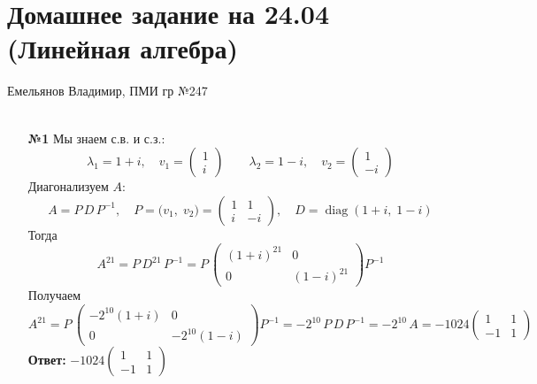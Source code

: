\documentclass[a4paper]{article}
\begin{document}
\section*{Домашнее задание на 24.04 (Линейная алгебра)}
{\large Емельянов Владимир, ПМИ гр №247}\\\\
\begin{enumerate}
  \item[\textbf{№1}]Мы знаем с.в. и с.з.:
  $$\lambda_1=1+i,\quad v_1=\begin{pmatrix}1\\i\end{pmatrix}
  \qquad
  \lambda_2=1-i,\quad v_2=\begin{pmatrix}1\\-i\end{pmatrix}$$
  Диагонализуем \(A\):
  \[
  A = P\,D\,P^{-1},\quad
  P=\bigl(v_1,\;v_2\bigr)
  =\begin{pmatrix}1&1\\i&-i\end{pmatrix},\quad
  D=\operatorname{diag}(1+i,\;1-i)
  \]
  Тогда
  $$
  A^{21}
  = P\,D^{21}\,P^{-1}
  = P\,\begin{pmatrix}(1+i)^{21}&0\\0&(1-i)^{21}\end{pmatrix}P^{-1}
  $$
  Получаем
  $$
  A^{21}
  = P\,\begin{pmatrix}-2^{10}(1+i)&0\\0&-2^{10}(1-i)\end{pmatrix}P^{-1}
  =-2^{10}\,P\,D\,P^{-1}
  =-2^{10}\,A
  =-1024\begin{pmatrix}1&1\\-1&1\end{pmatrix}
  $$
  \textbf{Ответ: } $-1024\begin{pmatrix}1&1\\-1&1\end{pmatrix}$

  
\end{enumerate}
\end{document}
